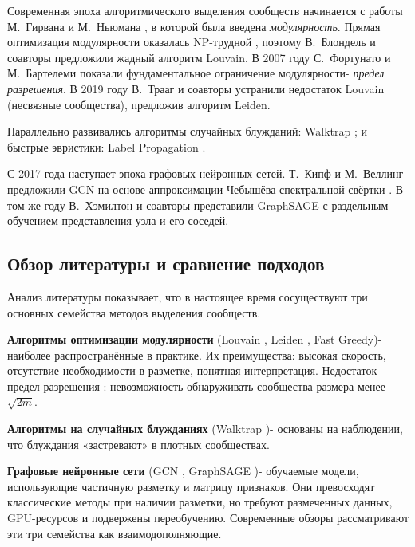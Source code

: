 \documentclass[14pt,a4paper]{extarticle}
\begin{document}
Современная эпоха алгоритмического выделения сообществ начинается с работы М.~Гирвана и М.~Ньюмана \cite{girvan2002}, в которой была введена \emph{модулярность}. Прямая оптимизация модулярности оказалась NP-трудной \cite{brandes2008}, поэтому В.~Блондель и соавторы \cite{blondel2008} предложили жадный алгоритм Louvain. В 2007 году С.~Фортунато и М.~Бартелеми \cite{fortunato2007} показали фундаментальное ограничение модулярности- \emph{предел разрешения}. В 2019 году В.~Трааг и соавторы \cite{traag2019} устранили недостаток Louvain (несвязные сообщества), предложив алгоритм Leiden.

Параллельно развивались алгоритмы случайных блужданий: Walktrap \cite{pons2006}; и быстрые эвристики: Label Propagation \cite{raghavan2007}.

С 2017 года наступает эпоха графовых нейронных сетей. Т.~Кипф и М.~Веллинг \cite{kipf2017} предложили GCN на основе аппроксимации Чебышёва спектральной свёртки \cite{defferrard2016}. В том же году В.~Хэмилтон и соавторы \cite{hamilton2017} представили GraphSAGE с раздельным обучением представления узла и его соседей.

\subsection{Обзор литературы и сравнение подходов}

Анализ литературы показывает, что в настоящее время сосуществуют три основных семейства методов выделения сообществ.

\textbf{Алгоритмы оптимизации модулярности} (Louvain \cite{blondel2008}, Leiden \cite{traag2019}, Fast Greedy)- наиболее распространённые в практике. Их преимущества: высокая скорость, отсутствие необходимости в разметке, понятная интерпретация. Недостаток- предел разрешения \cite{fortunato2007}: невозможность обнаруживать сообщества размера менее $\sqrt{2m}$.

\textbf{Алгоритмы на случайных блужданиях} (Walktrap \cite{pons2006})- основаны на наблюдении, что блуждания «застревают» в плотных сообществах. 

\textbf{Графовые нейронные сети} (GCN \cite{kipf2017}, GraphSAGE \cite{hamilton2017})- обучаемые модели, использующие частичную разметку и матрицу признаков. Они превосходят классические методы при наличии разметки, но требуют размеченных данных, GPU-ресурсов и подвержены переобучению. Современные обзоры \cite{newman2010,diestel2017} рассматривают эти три семейства как взаимодополняющие.
\end{document}
